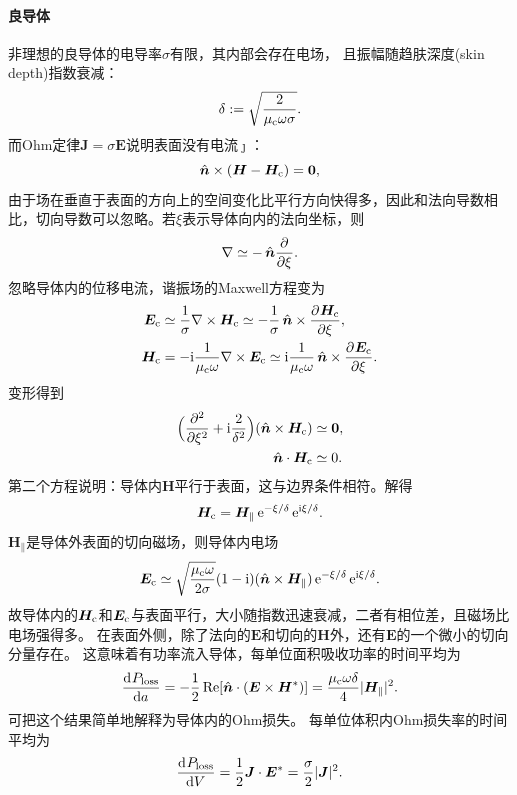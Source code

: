 \paragraph{良导体}

非理想的良导体的电导率$\sigma$有限，其内部会存在电场，
且振幅随趋肤深度(skin depth)指数衰减：
\begin{equation}
    \delta:=\sqrt{\frac2{\mu\c\omega\sigma}}.
\end{equation}
而Ohm定律$\bm J=\sigma\bm E$说明表面没有电流$\bm\jmath$：
\[
    \uvec n\times(\bm H-\bm H\c)=\bm 0,
\]
由于场在垂直于表面的方向上的空间变化比平行方向快得多，因此和法向导数相比，切向导数可以忽略。若$\xi$表示导体向内的法向坐标，则
\[
    \nabla\simeq-\uvec n\pp\xi.
\]
忽略导体内的位移电流，谐振场的Maxwell方程变为
\begin{align*}
    \bm E\c&\simeq\frac1\sigma\curl\bm H\c\simeq-\frac1\sigma\uvec n\times\pv{\bm H\c}\xi,\\
    \bm H\c&=-\i\frac1{\mu\c\omega}\curl\bm E\c\simeq\i\frac1{\mu\c\omega}\uvec n\times\pv{\bm E\c}\xi.
\end{align*}
变形得到
\begin{align*}
    \Bigkh{\pp[2]\xi+\i\frac2{\delta^2}}(\uvec n\times\bm H\c)&\simeq\bm 0,\\
    \uvec n\cdot\bm H\c&\simeq 0.
\end{align*}
第二个方程说明：导体内$\bm H$平行于表面，这与边界条件相符。解得
\begin{equation}
    \bm H\c=\bm H_\parallel\e{-\xi/\delta}\e{\i\xi/\delta}.
\end{equation}
$\bm H_\parallel$是导体外表面的切向磁场，则导体内电场
\begin{equation}
    \bm E\c\simeq\sqrt{\frac{\mu\c\omega}{2\sigma}}(1-\i)(\uvec n\times\bm H_\parallel)\e{-\xi/\delta}\e{\i\xi/\delta}.
\end{equation}
故导体内的$\bm H\c$和$\bm E\c$与表面平行，大小随指数迅速衰减，二者有相位差，且磁场比电场强得多。
在表面外侧，除了法向的$\bm E$和切向的$\bm H$外，还有$\bm E$的一个微小的切向分量存在。
这意味着有功率流入导体，每单位面积吸收功率的时间平均为
\begin{equation}
    \dv{P_\text{loss}}a=-\frac12\Re[\uvec n\cdot(\bm E\times\bm H\cj)]=\frac{\mu\c\omega\delta}4|\bm H_\parallel|^2.
\end{equation}
可把这个结果简单地解释为导体内的Ohm损失。
每单位体积内Ohm损失率的时间平均为
\[
    \dv{P_\text{loss}}V=\frac12\bm J\cdot\bm E\cj=\frac\sigma 2|\bm J|^2.
\]
